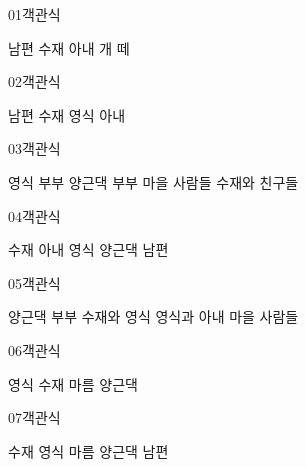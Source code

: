 \documentclass[fs9,seriesRus]{korfarm-base}
\begin{document}
\par\medskip
\kfBeginMC
\begin{kfQBlock}{01}{객관식}
\begin{kfChoices}
\kfChoice 남편
\kfChoice 수재
\kfChoice 아내
\kfChoice 개 떼
\end{kfChoices}
\end{kfQBlock}
\begin{kfQBlock}{02}{객관식}
\begin{kfChoices}
\kfChoice 남편
\kfChoice 수재
\kfChoice 영식
\kfChoice 아내
\end{kfChoices}
\end{kfQBlock}
\begin{kfQBlock}{03}{객관식}
\begin{kfChoices}
\kfChoice 영식 부부
\kfChoice 양근댁 부부
\kfChoice 마을 사람들
\kfChoice 수재와 친구들
\end{kfChoices}
\end{kfQBlock}
\begin{kfQBlock}{04}{객관식}
\begin{kfChoices}
\kfChoice 수재
\kfChoice 아내
\kfChoice 영식
\kfChoice 양근댁 남편
\end{kfChoices}
\end{kfQBlock}
\begin{kfQBlock}{05}{객관식}
\begin{kfChoices}
\kfChoice 양근댁 부부
\kfChoice 수재와 영식
\kfChoice 영식과 아내
\kfChoice 마을 사람들
\end{kfChoices}
\end{kfQBlock}
\begin{kfQBlock}{06}{객관식}
\begin{kfChoices}
\kfChoice 영식
\kfChoice 수재
\kfChoice 마름
\kfChoice 양근댁
\end{kfChoices}
\end{kfQBlock}
\begin{kfQBlock}{07}{객관식}
\begin{kfChoices}
\kfChoice 수재
\kfChoice 영식
\kfChoice 마름
\kfChoice 양근댁 남편
\end{kfChoices}
\end{kfQBlock}
\end{document}
